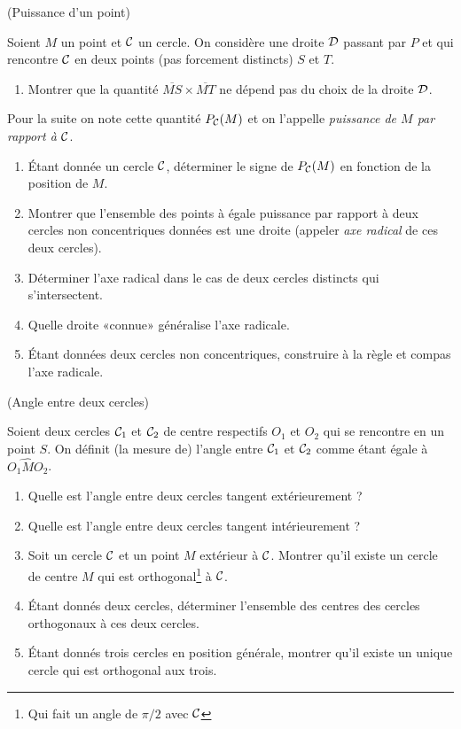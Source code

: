 \documentclass[a4paper,11pt,reqno]{amsart}
\begin{document}
\begin{exo} (Puissance d'un point)

  Soient $M$ un point et $\mathcal{C}$ un cercle. On considère une droite $\mathcal{D}$ passant par $P$ et qui rencontre $\mathcal{C}$ en deux points (pas forcement distincts) $S$ et $T$.
  \begin{enumerate}
    \item Montrer que la quantité $\overline{MS}\times \overline{MT}$ ne dépend pas du choix de la droite $\mathcal{D}$.
  \end{enumerate}
  \begin{convention}
    Pour la suite on note cette quantité $P_{\mathcal{C}}(M)$ et on l'appelle \emph{puissance de $M$ par rapport à $\mathcal{C}$}.
  \end{convention}
  \begin{enumerate}[resume]
    \item Étant donnée un cercle $\mathcal{C}$, déterminer le signe de $P_{\mathcal{C}}(M)$ en fonction de la position de $M$.
    \item Montrer que l'ensemble des points à égale puissance par rapport à deux cercles non concentriques données est une droite (appeler \emph{axe radical} de ces deux cercles).
    \item Déterminer l'axe radical dans le cas de deux cercles distincts qui s'intersectent.
    \item Quelle droite «connue» généralise l'axe radicale.
    \item Étant données deux cercles non concentriques, construire à la règle et compas l'axe radicale.
  \end{enumerate}
\end{exo}

\begin{exo} (Angle entre deux cercles)

  Soient deux cercles $\mathcal{C}_{1}$ et $\mathcal{C}_{2}$ de centre respectifs $O_{1}$ et $O_{2}$ qui se rencontre en un point $S$. On définit (la mesure de) l'angle entre $\mathcal{C}_{1}$ et $\mathcal{C}_{2}$ comme étant égale à $\widehat{O_{1}MO_{2}}$.
  \begin{enumerate}
    \item Quelle est l'angle entre deux cercles tangent extérieurement ?
    \item Quelle est l'angle entre deux cercles tangent intérieurement ?
    \item Soit un cercle $\mathcal{C}$ et un point $M$ extérieur à $\mathcal{C}$. Montrer qu'il existe un cercle de centre $M$ qui est orthogonal\footnote{Qui fait un angle de $\pi/2$ avec $\mathcal{C}$} à $\mathcal{C}$.
    \item Étant donnés deux cercles, déterminer l'ensemble des centres des cercles orthogonaux à ces deux cercles.
    \item Étant donnés trois cercles en position générale, montrer qu'il existe un unique cercle qui est orthogonal aux trois.
  \end{enumerate}
\end{exo}
\end{document}
